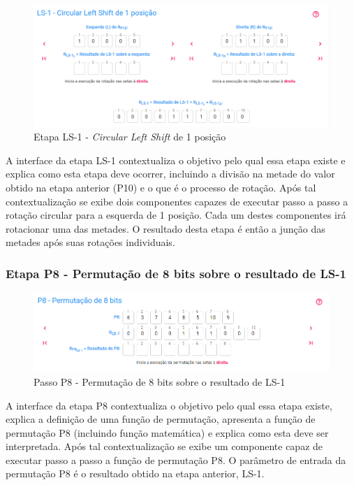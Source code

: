 \begin{figure}[H]
    \centering
    \caption{Etapa LS-1 - \textit{Circular Left Shift} de 1 posição}
    \includegraphics[width=1\linewidth]{UI/UILS1.png}
\end{figure}

A interface da etapa LS-1 contextualiza o objetivo pelo qual essa etapa existe e explica como esta etapa deve ocorrer, incluindo a divisão na metade do valor obtido na etapa anterior (P10) e o que é o processo de rotação. Após tal contextualização se exibe dois componentes capazes de executar passo a passo a rotação circular para a esquerda de 1 posição. Cada um destes componentes irá rotacionar uma das metades. O resultado desta etapa é então a junção das metades após suas rotações individuais.

\subsubsection{Etapa P8 - Permutação de 8 bits sobre o resultado de LS-1}

\begin{figure}[H]
    \centering
    \caption{Passo P8 - Permutação de 8 bits sobre o resultado de LS-1}
    \includegraphics[width=1\linewidth]{UI/UIP81.png}
\end{figure}

A interface da etapa P8 contextualiza o objetivo pelo qual essa etapa existe, explica a definição de uma função de permutação, apresenta a função de permutação P8 (incluindo função matemática) e explica como esta deve ser interpretada. Após tal contextualização se exibe um componente capaz de executar passo a passo a função de permutação P8. O parâmetro de entrada da permutação P8 é o resultado obtido na etapa anterior, LS-1.

